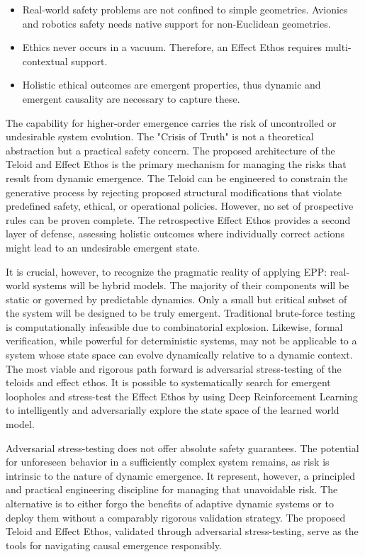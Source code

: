 \begin{itemize}
    \item Real-world safety problems are not confined to simple geometries. Avionics and robotics safety needs native support
    for non-Euclidean geometries.
    \item Ethics never occurs in a vacuum. Therefore, an Effect Ethos requires multi-contextual support.
    \item Holistic ethical outcomes are emergent properties, thus dynamic and emergent causality are necessary to capture these.
\end{itemize}

The capability for higher-order emergence carries the risk of uncontrolled or undesirable system evolution. The "Crisis of Truth" is not a theoretical abstraction but a practical safety concern. The proposed architecture of the Teloid and Effect Ethos is the primary mechanism for managing the risks that result from dynamic emergence. The Teloid can be engineered to constrain the generative process by rejecting proposed structural modifications that violate predefined safety, ethical, or operational policies. However, no set of prospective rules can be proven complete. The retrospective Effect Ethos provides a second layer of defense, assessing holistic outcomes where individually correct actions might lead to an undesirable emergent state.

It is crucial, however, to recognize the pragmatic reality of applying EPP: real-world systems will be hybrid models. The majority of their components will be static or governed by predictable dynamics. Only a small but critical subset of the system will be designed to be truly emergent.
Traditional brute-force testing is computationally infeasible due to combinatorial explosion.
Likewise, formal verification, while powerful for deterministic systems, may not be applicable to a system whose state space can evolve dynamically relative to a dynamic context.
The most viable and rigorous path forward is adversarial stress-testing of the teloids and effect ethos.
It is possible to systematically search for emergent loopholes and stress-test the Effect Ethos
by using Deep Reinforcement Learning to intelligently and adversarially explore the state space of the learned world model.

Adversarial stress-testing does not offer absolute safety guarantees. The potential for unforeseen behavior in a sufficiently complex system remains, as risk is intrinsic to the nature of dynamic emergence. It represent, however, a principled and practical engineering discipline for managing that unavoidable risk.
The alternative is to either forgo the benefits of adaptive dynamic systems or to deploy them without a comparably rigorous validation strategy.
The proposed Teloid and Effect Ethos, validated through adversarial stress-testing, serve as the tools for navigating causal emergence responsibly.

